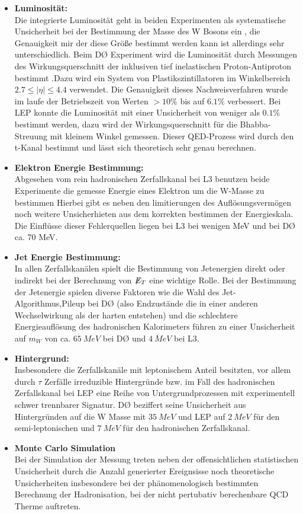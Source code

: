 \documentclass[a4paper,12pt]{article}
\newcommand{\met}{\ensuremath{\not\mathrel{E}}_T}
\begin{document}
\begin{itemize}
	\item \textbf{Luminosität:} \\
	Die integrierte Luminosität geht in beiden Experimenten als systematische Unsicherheit bei der Bestimmung der Masse des W Bosons ein
	, die Genauigkeit mir der diese Größe bestimmt werden kann ist allerdings sehr unterschiedlich. Beim DØ Experiment wird die Luminosität
	durch Messungen des Wirkungsquerschnitt der inklusiven tief inelastischen Proton-Antiproton bestimmt \cite{2011arXiv1106.5182P}.Dazu
	wird ein System von Plastikszintillatoren im Winkelbereich $2.7 \leq |\eta| \leq 4.4$ verwendet. Die Genauigkeit dieses Nachweisverfahren wurde
	im laufe der Betriebszeit von Werten $ > 10\%$ bis auf $ 6.1\%$ verbessert. Bei LEP konnte die Luminosität mit einer Unsicherheit von weniger
	als $0.1\%$ bestimmt werden, dazu wird der Wirkungsquerschnitt für die Bhabba-Streuung mit kleinem Winkel gemessen. Dieser QED-Prozess
	wird durch den t-Kanal bestimmt und lässt sich theoretisch sehr genau berechnen.
	\item \textbf{Elektron Energie Bestimmung:} \\
	Abgesehen vom rein hadronischen Zerfallskanal bei L3 benutzen beide Experimente die gemesse Energie eines Elektron um die W-Masse zu bestimmen
	Hierbei gibt es neben den limitierungen des Auflösungsvermögen noch weitere Unsicherhieten aus dem korrekten bestimmen der Energieskala.
	Die Einflüsse dieser Fehlerquellen liegen bei L3 bei wenigen MeV und bei DØ ca. 70 MeV.
	\item \textbf{Jet Energie Bestimmung:} \\
	In allen Zerfallskanälen spielt die Bestimmung von Jetenergien direkt oder indirekt bei der Berechnung von $\met$ eine wichtige Rolle. Bei der 
	Bestimmung der Jetenergie spielen diverse Faktoren wie die Wahl des Jet-Algorithmus,Pileup bei DØ (also Endzustände die in einer anderen Wechselwirkung
	als der harten entstehen) und die schlechtere Energieauflösung des hadronischen Kalorimeters führen zu einer Unsicherheit auf $m_{W}$ von 
	ca. $\SI{65}{MeV}$ bei DØ und $\SI{4}{MeV}$ bei L3.
	\item \textbf{Hintergrund:}\\
	Insbesondere die Zerfallskanäle mit leptonischem Anteil besitzten, vor allem durch $\tau$ Zerfälle irreduzible Hintergründe bzw. im Fall
	des hadronischen Zerfallskanal bei LEP eine Reihe von Untergrundprozessen mit experimentell schwer trennbarer Signatur. DØ beziffert seine 
	Unsicherheit aus Hintergründen auf die W Masse mit $\SI{35}{MeV}$ und LEP auf $\SI{2}{MeV}$ für den semi-leptonischen und $\SI{7}{MeV}$ 
	für den hadronischen Zerfallskanal.
	\item \textbf{Monte Carlo Simulation}\\
	Bei der Simulation der Messung treten neben der offensichtlichen statistischen Unsicherheit durch die Anzahl generierter Ereignsisse noch
	theoretische Unsicherheiten insbesondere bei der phänomenologisch bestimmten Berechnung der Hadronisation, bei der nicht pertubativ berechenbare
	QCD Therme auftreten. 
\end{itemize}
\end{document}
